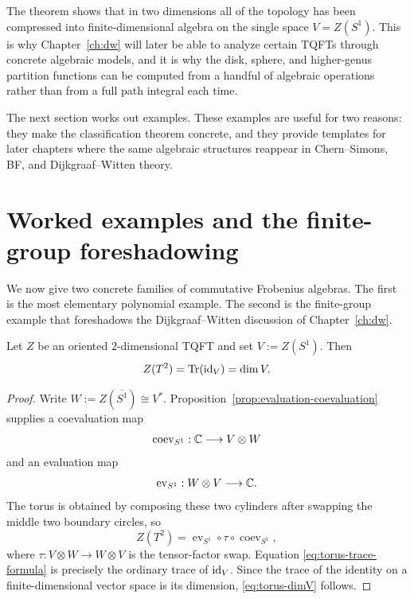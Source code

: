 \begin{remark}\label{rem:why-classification-matters}
The theorem shows that in two dimensions all of the topology has been compressed into finite-dimensional algebra on the single space $V=Z(S^1)$. This is why Chapter~\ref{ch:dw} will later be able to analyze certain TQFTs through concrete algebraic models, and it is why the disk, sphere, and higher-genus partition functions can be computed from a handful of algebraic operations rather than from a full path integral each time.
\end{remark}

\medskip

\noindent The next section works out examples. These examples are useful for two reasons: they make the classification theorem concrete, and they provide templates for later chapters where the same algebraic structures reappear in Chern--Simons, BF, and Dijkgraaf--Witten theory.

\section{Worked examples and the finite-group foreshadowing}\label{sec:frobenius-examples}

We now give two concrete families of commutative Frobenius algebras. The first is the most elementary polynomial example. The second is the finite-group example that foreshadows the Dijkgraaf--Witten discussion of Chapter~\ref{ch:dw}.

\begin{proposition}\label{prop:torus-partition}
Let $Z$ be an oriented $2$-dimensional TQFT and set $V := Z(S^1)$. Then
\begin{equation}\label{eq:torus-dimV}
Z(T^2)=\operatorname{Tr}(\operatorname{id}_V)=\dim V.
\end{equation}
\end{proposition}

\begin{proof}
Write $W := Z(\overline{S^1}) \cong V^*$. Proposition~\ref{prop:evaluation-coevaluation} supplies a coevaluation map
\begin{equation*}
\operatorname{coev}_{S^1} : \mathbb{C} \longrightarrow V \otimes W
\end{equation*}
and an evaluation map
\begin{equation*}
\operatorname{ev}_{S^1} : W \otimes V \longrightarrow \mathbb{C}.
\end{equation*}
The torus is obtained by composing these two cylinders after swapping the middle two boundary circles, so
\begin{equation}\label{eq:torus-trace-formula}
Z(T^2) = \operatorname{ev}_{S^1} \circ \tau \circ \operatorname{coev}_{S^1},
\end{equation}
where $\tau : V \otimes W \to W \otimes V$ is the tensor-factor swap. Equation \eqref{eq:torus-trace-formula} is precisely the ordinary trace of $\operatorname{id}_V$. Since the trace of the identity on a finite-dimensional vector space is its dimension, \eqref{eq:torus-dimV} follows.
\end{proof}

